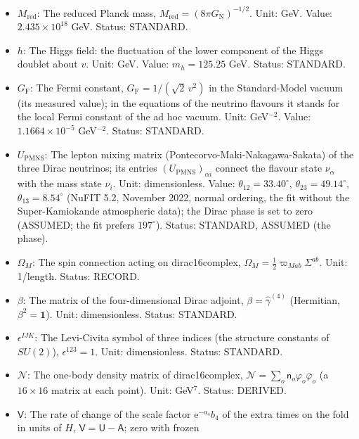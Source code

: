 \documentclass[
  10pt,
]{article}
\providecommand{\tightlist}{%
  \setlength{\itemsep}{0pt}\setlength{\parskip}{0pt}}
\begin{document}
\begin{itemize}
\tightlist
\item
  \(M_{\mathrm{red}}\): The reduced Planck mass,
  \(M_{\mathrm{red}} = (8\pi G_{\mathrm{N}})^{-1/2}\). Unit: GeV. Value:
  \(2.435\times10^{18}\) GeV. Status: STANDARD.
\item
  \(h\): The Higgs field: the fluctuation of the lower component of the
  Higgs doublet about \(v\). Unit: GeV. Value: \(m_h = 125.25\) GeV.
  Status: STANDARD.
\item
  \(G_{\mathrm{F}}\): The Fermi constant,
  \(G_{\mathrm{F}} = 1/(\sqrt2\,v^2)\) in the Standard-Model vacuum (its
  measured value); in the equations of the neutrino flavours it stands
  for the local Fermi constant of the ad hoc vacuum. Unit: GeV\(^{-2}\).
  Value: \(1.1664\times10^{-5}\) GeV\(^{-2}\). Status: STANDARD.
\item
  \(U_{\mathrm{PMNS}}\): The lepton mixing matrix
  (Pontecorvo-Maki-Nakagawa-Sakata) of the three Dirac neutrinos; its
  entries \((U_{\mathrm{PMNS}})_{\alpha i}\) connect the flavour state
  \(\nu_\alpha\) with the mass state \(\nu_i\). Unit: dimensionless.
  Value: \(\theta_{12} = 33.40^\circ\), \(\theta_{23} = 49.14^\circ\),
  \(\theta_{13} = 8.54^\circ\) (NuFIT 5.2, November 2022, normal
  ordering, the fit without the Super-Kamiokande atmospheric data); the
  Dirac phase is set to zero (ASSUMED; the fit prefers \(197^\circ\)).
  Status: STANDARD, ASSUMED (the phase).
\item
  \(\Omega_M\): The spin connection acting on dirac16complex,
  \(\Omega_M = \frac12\varpi_{Mab}\Sigma^{ab}\). Unit: 1/length. Status:
  RECORD.
\item
  \(\beta\): The matrix of the four-dimensional Dirac adjoint,
  \(\beta = \hat\gamma^{(4)}\) (Hermitian, \(\beta^2 = \mathbf{1}\)).
  Unit: dimensionless. Status: STANDARD.
\item
  \(\epsilon^{IJK}\): The Levi-Civita symbol of three indices (the
  structure constants of \(SU(2)\)), \(\epsilon^{123} = 1\). Unit:
  dimensionless. Status: STANDARD.
\item
  \(\mathcal{N}\): The one-body density matrix of dirac16complex,
  \(\mathcal{N} = \sum_o\mathsf{n}_o\varphi_o\bar\varphi_o\) (a
  \(16 \times 16\) matrix at each point). Unit: GeV\(^7\). Status:
  DERIVED.
\item
  \(\mathsf{V}\): The rate of change of the scale factor
  \(\mathrm{e}^{-a_4}b_4\) of the extra times on the fold in units of
  \(H\), \(\mathsf{V} = \mathsf{U} - \mathsf{A}\); zero with frozen

\end{itemize}
\end{document}
